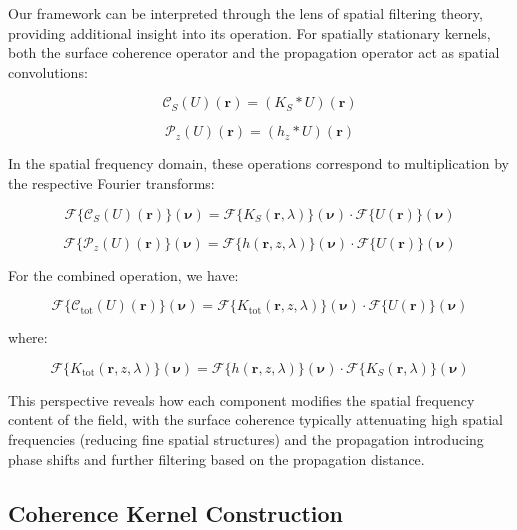 \documentclass[a4paper,12pt]{article}
\begin{document}
Our framework can be interpreted through the lens of spatial filtering theory, providing additional insight into its operation. For spatially stationary kernels, both the surface coherence operator and the propagation operator act as spatial convolutions:

\begin{equation}
\mathcal{C}_S(U)(\bm{r}) = (K_S * U)(\bm{r})
\end{equation}

\begin{equation}
\mathcal{P}_z(U)(\bm{r}) = (h_z * U)(\bm{r})
\end{equation}

In the spatial frequency domain, these operations correspond to multiplication by the respective Fourier transforms:

\begin{equation}
\mathcal{F}\{\mathcal{C}_S(U)(\bm{r})\}(\bm{\nu}) = \mathcal{F}\{K_S(\bm{r}, \lambda)\}(\bm{\nu}) \cdot \mathcal{F}\{U(\bm{r})\}(\bm{\nu})
\end{equation}

\begin{equation}
\mathcal{F}\{\mathcal{P}_z(U)(\bm{r})\}(\bm{\nu}) = \mathcal{F}\{h(\bm{r}, z, \lambda)\}(\bm{\nu}) \cdot \mathcal{F}\{U(\bm{r})\}(\bm{\nu})
\end{equation}

For the combined operation, we have:

\begin{equation}
\mathcal{F}\{\mathcal{C}_{\text{tot}}(U)(\bm{r})\}(\bm{\nu}) = \mathcal{F}\{K_{\text{tot}}(\bm{r}, z, \lambda)\}(\bm{\nu}) \cdot \mathcal{F}\{U(\bm{r})\}(\bm{\nu})
\end{equation}

where:

\begin{equation}
\mathcal{F}\{K_{\text{tot}}(\bm{r}, z, \lambda)\}(\bm{\nu}) = \mathcal{F}\{h(\bm{r}, z, \lambda)\}(\bm{\nu}) \cdot \mathcal{F}\{K_S(\bm{r}, \lambda)\}(\bm{\nu})
\end{equation}

This perspective reveals how each component modifies the spatial frequency content of the field, with the surface coherence typically attenuating high spatial frequencies (reducing fine spatial structures) and the propagation introducing phase shifts and further filtering based on the propagation distance.

\subsection{Coherence Kernel Construction}
\end{document}
